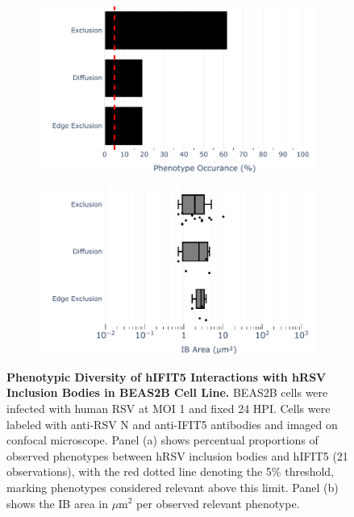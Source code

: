 \begin{figure}
    \begin{subfigure}{0.495\textwidth}
        \caption{}
        \includegraphics[width=1\linewidth]{08. Chapter 3/Figs/02. Infection/04. IFIT5/04. bar_i5_beas2b.pdf}
    \end{subfigure}
    \begin{subfigure}{0.495\textwidth}
        \caption{}
        \includegraphics[width=1\linewidth]{08. Chapter 3/Figs/02. Infection/04. IFIT5/05. box_i5_beas2b.pdf}
    \end{subfigure}
    \caption[Phenotypic Diversity of hIFIT5 Interactions with hRSV Inclusion Bodies in BEAS2B Cell Line.]{\textbf{Phenotypic Diversity of hIFIT5 Interactions with hRSV Inclusion Bodies in BEAS2B Cell Line.} BEAS2B cells were infected with human RSV at MOI 1 and fixed 24 HPI. Cells were labeled with anti-RSV N and anti-IFIT5 antibodies and imaged on confocal microscope. Panel (a) shows percentual proportions of observed phenotypes between hRSV inclusion bodies and hIFIT5 (21 observations), with the red dotted line denoting the 5\% threshold, marking phenotypes considered relevant above this limit. Panel (b) shows the IB area in \(\mu \mbox{m}^2\) per observed relevant phenotype.}
    \label{fig:Phenotypic Diversity of hIFIT5 Interactions with hRSV Inclusion Bodies in BEAS2B Cell Line}
\end{figure}

